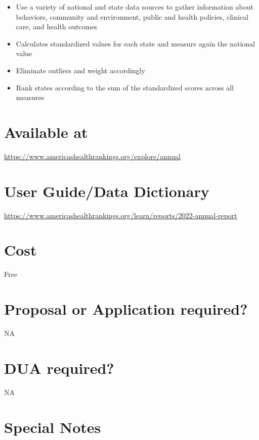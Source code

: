 \documentclass[
]{book}
\providecommand{\tightlist}{%
  \setlength{\itemsep}{0pt}\setlength{\parskip}{0pt}}
\begin{document}
\begin{itemize}
\tightlist
\item
  Use a variety of national and state data sources to gather information about behaviors, community and environment, public and health policies, clinical care, and health outcomes
\item
  Calculates standardized values for each state and measure again the national value
\item
  Eliminate outliers and weight accordingly
\item
  Rank states according to the sum of the standardized scores across all measures
\end{itemize}

\hypertarget{available-at-2}{%
\section{Available at}\label{available-at-2}}

\url{https://www.americashealthrankings.org/explore/annual}

\hypertarget{user-guidedata-dictionary-2}{%
\section{User Guide/Data Dictionary}\label{user-guidedata-dictionary-2}}

\url{https://www.americashealthrankings.org/learn/reports/2022-annual-report}

\hypertarget{cost-2}{%
\section{Cost}\label{cost-2}}

Free

\hypertarget{proposal-or-application-required-2}{%
\section{Proposal or Application required?}\label{proposal-or-application-required-2}}

NA

\hypertarget{dua-required-2}{%
\section{DUA required?}\label{dua-required-2}}

NA

\hypertarget{special-notes-2}{%
\section{Special Notes}\label{special-notes-2}}
\end{document}
